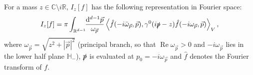 \documentclass[10pt,a4paper,oneside,reqno]{amsart}
\newcommand{\reals}{\mathbb{R}}
\newcommand{\complexes}{\mathbb{C}}
\renewcommand{\Re}{\operatorname{Re}}
\begin{document}
\begin{lemma}\label{reduction to on shell}
 For a mass $z \in \complexes\setminus i\reals$,  $I_z[f]$ has the following representation in Fourier space:
    \begin{equation}
        I_z[f] = \pi\int_{\mathbb{R}^{d-1}} \!\! \frac{\mathrm{d}^{d-1}\vec{p}}{\omega_{\vec{p}}} \left\langle \hat{f}(-i{\bar\omega}_{\vec{p}},\vec{p}), \gamma^0  (i\slashed p - z)\hat{f}(-i\omega_{\vec{p}},\vec{p})\right\rangle_V, 
    \end{equation} 
   where $\omega_{\vec{p}} = \sqrt{z^2 + |\vec{p}|^2}$ (principal branch, so that $\Re\omega_{\vec{p}} > 0$ and $-i\omega_{\vec{p}}$ lies in the lower half plane $\mathbb{H}_-$), $\slashed p$ is evaluated at $p_0 = -i\omega_{\vec{p}}$ and $\hat{f}$ denotes the Fourier transform of $f$.
\end{lemma}
\end{document}
